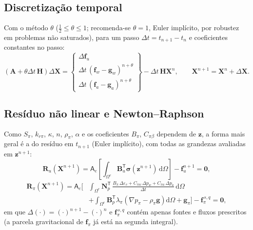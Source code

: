 \documentclass[11pt,a4paper]{article}
\newcommand{\dd}{\mathrm{d}}
\begin{document}
\subsection{Discretização temporal}

Com o método $\theta$ ($\tfrac12\leq\theta\leq1$; recomenda-se $\theta=1$,
Euler implícito, por robustez em problemas não saturados), para um passo
$\Delta t=t_{n+1}-t_n$ e coeficientes constantes no passo:
\begin{equation*}
\boxed{\left(\mathbf A+\theta\Delta t\,\mathbf H\right)\Delta\mathbf X
=\begin{Bmatrix}\Delta\mathbf f_u\\ \Delta t\,(\mathbf f_w-\mathbf g_w)^{n+\theta}\\ \Delta t\,(\mathbf f_a-\mathbf g_a)^{n+\theta}\end{Bmatrix}
-\Delta t\,\mathbf H\mathbf X^{n},
\qquad \mathbf X^{n+1}=\mathbf X^{n}+\Delta\mathbf X.}
\end{equation*}

\subsection{Resíduo não linear e Newton--Raphson}

Como $S_\pi$, $k_{r\pi}$, $\kappa$, $n$, $\rho_\pi$, $\alpha$ e os coeficientes
$B_\pi$, $C_{\pi\beta}$ dependem de $\mathbf z$, a forma mais geral é
a do resíduo em $t_{n+1}$ (Euler implícito), com todas as grandezas
avaliadas em $\mathbf z^{n+1}$:
\begin{equation*}
\boxed{\mathbf R_u(\mathbf X^{n+1})=\mathsf A_e\!\left[
\int_{\Omega^e}\mathbf B_u^{\mathsf T}\boldsymbol\sigma(\mathbf z^{n+1})\,\dd\Omega\right]
-\mathbf f_u^{n+1}=\mathbf 0,}
\end{equation*}
\begin{equation*}
\boxed{\begin{aligned}
\mathbf R_\pi(\mathbf X^{n+1})=\mathsf A_e\Bigg[
&\int_{\Omega^e}\mathbf N_p^{\mathsf T}\,
\frac{B_\pi\,\Delta\varepsilon_v+C_{\pi w}\,\Delta p_w+C_{\pi a}\,\Delta p_a}{\Delta t}\,\dd\Omega\\
&+\int_{\Omega^e}\mathbf B_p^{\mathsf T}\lambda_\pi\left(\nabla p_\pi-\rho_\pi\mathbf g\right)\dd\Omega
+\mathbf g_\pi\Bigg]
-\mathbf f_\pi^{\,s,q}=\mathbf 0,
\end{aligned}}
\end{equation*}
em que $\Delta(\cdot)=(\cdot)^{n+1}-(\cdot)^n$ e $\mathbf f_\pi^{\,s,q}$
contém apenas fontes e fluxos prescritos (a parcela gravitacional de
$\mathbf f_\pi$ já está na segunda integral).
\end{document}

